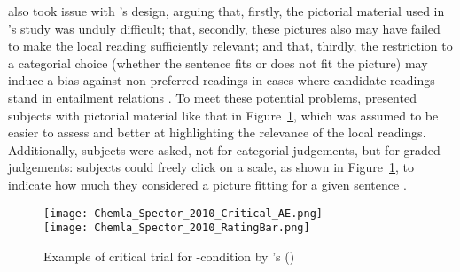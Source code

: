 \documentclass[fleqn,reqno,10pt,draft]{article}
\newcommand{\as}{\acro{as}}
\begin{document}
\citet{ChemlaSpector2010:Experimental-Ev} also took issue with
\citeauthor{GeurtsPouscoulous2009:Embedded-Implic}'s design, arguing
that, firstly, the pictorial material used in
\citeauthor{GeurtsPouscoulous2009:Embedded-Implic}'s study was unduly
difficult; that, secondly, these pictures also may have failed to make
the local reading sufficiently relevant; and that, thirdly, the
restriction to a categorial choice (whether the sentence fits or does
not fit the picture) may induce a bias against non-preferred readings
in cases where candidate readings stand in entailment relations
\citep[c.f.][for this latter
criticism]{Sauerland2010:Embedded-Implic}. To meet these potential
problems, \citet{ChemlaSpector2010:Experimental-Ev} presented subjects
with pictorial material like that in Figure~\ref{fig:Chemla-Spector},
which was assumed to be easier to assess and better at highlighting
the relevance of the local readings. Additionally, subjects were
asked, not for categorial judgements, but for graded judgements:
subjects could freely click on a scale, as shown in
Figure~\ref{fig:Chemla-Spector}, to indicate how much they considered
a picture fitting for a given sentence \citep[c.f.][for more on this
method]{Chemla2009:Presuppositions}.

\begin{figure}[t]
  \centering
      \texttt{[image: Chemla\_Spector\_2010\_Critical\_AE.png]}\\
      \texttt{[image: Chemla\_Spector\_2010\_RatingBar.png]}
        \caption{Example of critical trial for \as-condition by
          \citeauthor{ChemlaSpector2010:Experimental-Ev}'s
          (\citeyear{ChemlaSpector2010:Experimental-Ev})}
  \label{fig:Chemla-Spector}
\end{figure}
\end{document}
